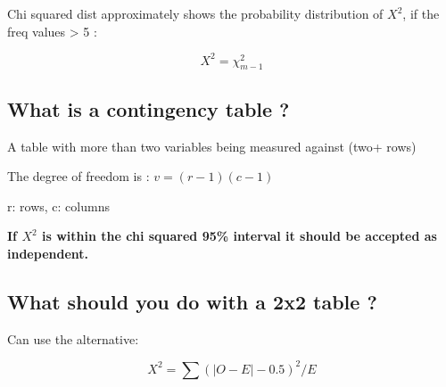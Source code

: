 \documentclass[11pt]{scrartcl} %
\begin{document}
Chi squared dist approximately shows the probability distribution of
\(X^2\), if the freq values \textgreater{} 5 :

\begin{equation}
	X^2 = \chi^2_{m-1}
\end{equation}

\subsection{What is a contingency table
?}

A table with more than two variables being measured against (two+ rows)

The degree of freedom is : \(v= (r-1)(c-1)\)

r: rows, c: columns

\textbf{If \(X^2\) is within the chi squared 95\% interval it should be
accepted as independent.}

\subsection{What should you do with a 2x2 table
?}

Can use the alternative:

\begin{equation}
	X^2 = \sum (|O-E|-0.5)^2/E
\end{equation}
\end{document}

